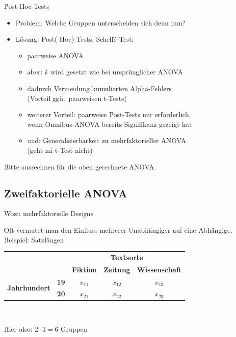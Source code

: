 \begin{frame}
  {Post-Hoc-Tests}
  \begin{itemize}[<+->]
    \item Problem: \alert{Welche Gruppen unterscheiden sich denn nun?}
    \Zeile
    \item Lösung: Post(-Hoc)-Tests, \zB Scheff\'e-Test:
      \begin{itemize}
	\item \alert{paarweise ANOVA}
	\item aber: \alert{$k$} wird gesetzt \alert{wie bei ursprünglicher ANOVA}
	\item dadurch Vermeidung kumulierten Alpha-Fehlers\\
	  (Vorteil ggü.\ paarweisen t-Tests)
	\item weiterer Vorteil: paarweise Post-Tests nur erforderlich,\\
	  wenn \alert{Omnibus-ANOVA} bereits Signifikanz gezeigt hat
	\item und: Generalisierbarkeit zu mehrfaktorieller ANOVA\\
	  (geht mi t-Test nicht)
      \end{itemize}
  \end{itemize}

  \vspace{0.2cm}
  \pause
  \begin{center}
    Bitte ausrechnen für die oben gerechnete ANOVA.
  \end{center}
\end{frame}

\subsection{Zweifaktorielle ANOVA}

\begin{frame}
  {Wozu mehrfaktorielle Designs}

  Oft vermutet man den Einfluss \alert{mehrerer Unabhängiger} auf eine Abhängige.\\
  Beispiel: Satzlängen

  \begin{center}
    \begin{tabular}[h!]{|cc|ccc|}
      \cline{3-5}
      \multicolumn{2}{c|}{} & \multicolumn{3}{c|}{\textbf{Textsorte}} \\
      \multicolumn{2}{c|}{} & \textbf{Fiktion} & \textbf{Zeitung} & \textbf{Wissenschaft} \\
      \hline
      \multirow{2}{*}{\textbf{Jahrhundert}} & \textbf{19} & $x_{11}$ & $x_{12}$ & $x_{13}$ \\
      & \textbf{20} & $x_{21}$ & $x_{22}$ & $x_{23}$ \\
      \hline
    \end{tabular}\\
    \vspace{0.5cm}

    Hier also: $2\cdot3=6$ Gruppen
  \end{center}
\end{frame}

